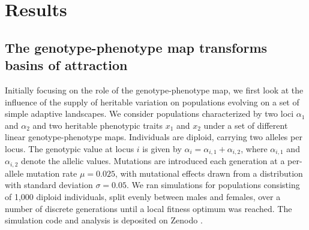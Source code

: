 \section{Results} \label{results}

\subsection{The genotype-phenotype map transforms basins of attraction}

 Initially focusing on the role of the genotype-phenotype map, we first look at the influence of the supply of heritable variation on populations evolving on a set of simple adaptive landscapes.
 We consider populations characterized by two loci $\alpha_1$ and $\alpha_2$ and two heritable phenotypic traits $x_1$ and $x_2$ under a set of different linear genotype-phenotype maps.
 Individuals are diploid, carrying two alleles per locus.
 The genotypic value at locus $i$ is given by $\alpha_i=\alpha_{i,1} +\alpha_{i,2}$, where $\alpha_{i,1}$ and $\alpha_{i,2}$ denote the allelic values.
 Mutations are introduced each generation at a per-allele mutation rate $\mu=0.025$, with mutational effects drawn from a distribution with standard deviation $\sigma=0.05$.
 We ran simulations for populations consisting of 1,000 diploid individuals, split evenly between males and females, over a number of discrete generations until a local fitness optimum was reached.
 The simulation code and analysis is deposited on Zenodo \parencite{christophnetz_2026_19204638}.
 
